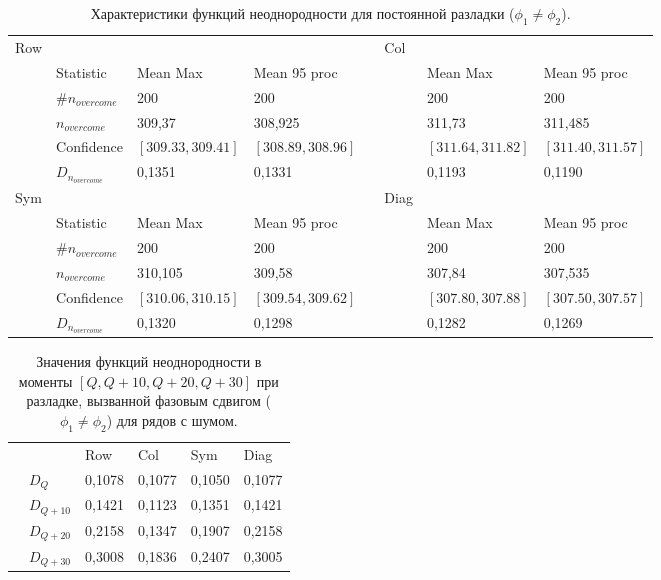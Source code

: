 \documentclass[specialist, substylefile = spbu.rtx,
			   subf, href, 12pt]{disser}
\begin{document}
\newpage
\begin{table}[!hhh]
	\center
	\caption{Характеристики функций неоднородности для постоянной разладки ($\phi_1 \neq \phi_2$).}
	\small
	\begin{tabular}{llllllll}
		Row & 				   & 		  	  & 			 && Col & 		      & 			      \\
		& Statistic        & Mean Max 	  & Mean 95 proc && 	& Mean Max     & Mean 95 proc     \\
		& $\#n_{overcome}$ & 200 	  	  & 200 		 &&     & 200 	      & 200 			  \\
		& $n_{overcome}$   & 309,37   	  & 308,925      &&     & 311,73       & 311,485 		  \\
		& Confidence       & $[309.33, 309.41]$& $[308.89, 308.96]$&&     & $[311.64, 311.82]$ & $[311.40, 311.57]$     \\
		&$D_{n_{overcome}}$& 0,1351	  &	0,1331		 &&     & 0,1193  &   0,1190         \\
		Sym & 				   & 		  	  & 			 && Diag& 		      & 			      \\
		& Statistic        & Mean Max 	  & Mean 95 proc && 	& Mean Max     & Mean 95 proc     \\
		& $\#n_{overcome}$ & 200 	  	  & 200 		 &&     & 200 	      & 200 			  \\
		& $n_{overcome}$   & 310,105   	  & 309,58      &&     & 307,84      & 307,535 		  \\
		& Confidence       & $[310.06, 310.15]$ & $[309.54, 309.62]$ &&     & $[307.80, 307.88]$ & $[307.50, 307.57]$     \\
		&$D_{n_{overcome}}$& 0,1320		  &	0,1298		 &&     & 0,1282		 &0,1269          \\
	\end{tabular}
	\label{tab:TemporaryHeterogeneityNoisedShifted}
\end{table}

\begin{table}[!hhh]
	\center
	\caption{Значения функций неоднородности в моменты $[Q, Q+10, Q+20, Q+30]$ при разладке, вызванной фазовым сдвигом ($\phi_1 \neq \phi_2$) для рядов с шумом.}
	\begin{tabular}{llllll}
		&              & Row 	  & Col 	& Sym    & Diag  \\
		& $D_Q$        & 0,1078	  & 0,1077 	& 0,1050 & 0,1077		\\
		& $D_{Q+10}$   & 0,1421   & 0,1123  & 0,1351 & 0,1421	\\
		& $D_{Q+20}$   & 0,2158   & 0,1347  & 0,1907 & 0,2158	\\
		& $D_{Q+30}$   & 0,3008	  &	0,1836	& 0,2407 & 0,3005	
	\end{tabular}
	\label{tab:TemporaryHeterogeneityNoisedShiftedValues}
\end{table}
\end{document}
